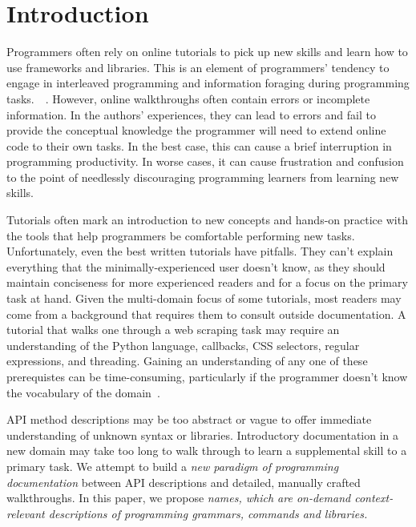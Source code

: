 \section{Introduction}

Programmers often rely on online tutorials to pick up new skills and learn how to use frameworks and libraries.
This is an element of programmers' tendency to engage in interleaved programming and information foraging during programming tasks.~\cite{brandt_two_2009}~\cite{brandt_example-centric_2010}.
However, online walkthroughs often contain errors or incomplete information.
In the authors' experiences, they can lead to errors and fail to provide the conceptual knowledge the programmer will need to extend online code to their own tasks.
In the best case, this can cause a brief interruption in programming productivity.
In worse cases, it can cause frustration and confusion to the point of needlessly discouraging programming learners from learning new skills.

Tutorials often mark an introduction to new concepts and hands-on practice with the tools that help programmers be comfortable performing new tasks.
Unfortunately, even the best written tutorials have pitfalls.
They can't explain everything that the minimally-experienced user doesn't know, as they should maintain conciseness for more experienced readers and for a focus on the primary task at hand.
Given the multi-domain focus of some tutorials, most readers may come from a background that requires them to consult outside documentation.
A tutorial that walks one through a web scraping task may require an understanding of the Python language, callbacks, CSS selectors, regular expressions, and threading.
Gaining an understanding of any one of these prerequistes can be time-consuming, particularly if the programmer doesn't know the vocabulary of the domain~\cite{furnas_vocabulary_1987}.

API method descriptions may be too abstract or vague to offer immediate understanding of unknown syntax or libraries.
Introductory documentation in a new domain may take too long to walk through to learn a supplemental skill to a primary task.
We attempt to build a \emph{new paradigm of programming documentation} between API descriptions and detailed, manually crafted walkthroughs.
In this paper, we propose \emph{\Glspl{name}, which are on-demand context-relevant descriptions of programming grammars, commands and libraries.}

